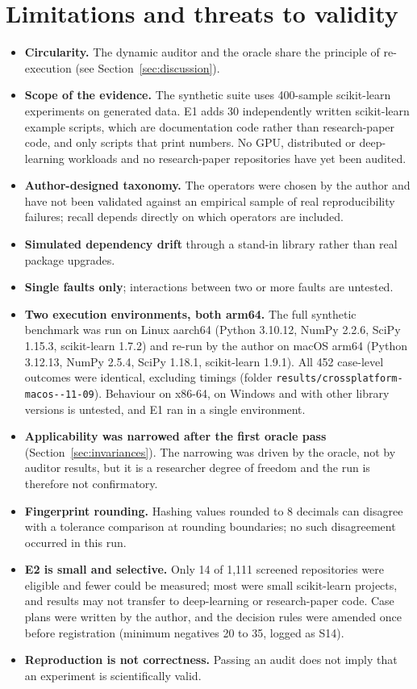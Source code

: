 \documentclass[11pt]{article}
\begin{document}
\section{Limitations and threats to validity}
\label{sec:limitations}
\begin{itemize}
  \item \textbf{Circularity.} The dynamic auditor and the oracle share the principle of re-execution (see Section~\ref{sec:discussion}).
  \item \textbf{Scope of the evidence.} The synthetic suite uses 400-sample scikit-learn experiments on generated data. E1 adds 30 independently written scikit-learn example scripts, which are documentation code rather than research-paper code, and only scripts that print numbers. No GPU, distributed or deep-learning workloads and no research-paper repositories have yet been audited.
  \item \textbf{Author-designed taxonomy.} The operators were chosen by the author and have not been validated against an empirical sample of real reproducibility failures; recall depends directly on which operators are included.
  \item \textbf{Simulated dependency drift} through a stand-in library rather than real package upgrades.
  \item \textbf{Single faults only}; interactions between two or more faults are untested.
  \item \textbf{Two execution environments, both arm64.} The full synthetic benchmark was run on Linux aarch64 (Python 3.10.12, NumPy 2.2.6, SciPy 1.15.3, scikit-learn 1.7.2) and re-run by the author on macOS arm64 (Python 3.12.13, NumPy 2.5.4, SciPy 1.18.1, scikit-learn 1.9.1). All 452 case-level outcomes were identical, excluding timings (folder \texttt{results/\allowbreak crossplatform-\allowbreak macos--11-09}). Behaviour on x86-64, on Windows and with other library versions is untested, and E1 ran in a single environment.
  \item \textbf{Applicability was narrowed after the first oracle pass} (Section~\ref{sec:invariances}). The narrowing was driven by the oracle, not by auditor results, but it is a researcher degree of freedom and the run is therefore not confirmatory.
  \item \textbf{Fingerprint rounding.} Hashing values rounded to 8 decimals can disagree with a tolerance comparison at rounding boundaries; no such disagreement occurred in this run.
  \item \textbf{E2 is small and selective.} Only 14 of 1{,}111 screened repositories were eligible and fewer could be measured; most were small scikit-learn projects, and results may not transfer to deep-learning or research-paper code. Case plans were written by the author, and the decision rules were amended once before registration (minimum negatives 20 to 35, logged as S14).
  \item \textbf{Reproduction is not correctness.} Passing an audit does not imply that an experiment is scientifically valid.
\end{itemize}
\end{document}

